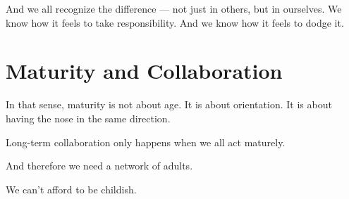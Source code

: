 \documentclass{article}
\begin{document}
And we all recognize the difference — not just in others, but in ourselves.
We know how it feels to take responsibility.
And we know how it feels to dodge it.

\section*{Maturity and Collaboration}

In that sense, maturity is not about age.
It is about orientation.
It is about having the nose in the same direction.

Long-term collaboration only happens when we all act maturely.

And therefore we need a network of adults.

We can’t afford to be childish.
\end{document}
